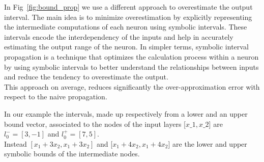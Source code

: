 In Fig~\ref{fig:bound_prop}  we use a different approach to overestimate the output interval. The main idea is to minimize overestimation by explicitly representing the intermediate computations of each neuron using symbolic intervals. These intervals encode the interdependency of the inputs and help in accurately estimating the output range of the neuron. In simpler terms, symbolic interval propagation is a technique that optimizes the calculation process within a neuron by using symbolic intervals to better understand the relationships between inputs and reduce the tendency to overestimate the output.\\
This approach on average, reduces significantly the over-approximation error with respect to the naive propagation.

\vspace{10mm}
In our example the intervals, made up respectively from a lower and an  upper bound vector, associated to the nodes of the input layers [$x\_1, x\_2$] are $l^{-}_0 = [3, -1]$ and $l^{+}_0 = [7,5]$.\\
Instead $[x_1 + 3x_2, x_1 + 3x_2]$ and [$x_1 + 4x_2, x_1 + 4x_2$] are the lower and upper symbolic bounds of the intermediate nodes.

